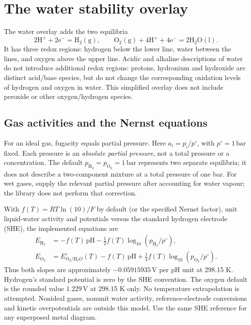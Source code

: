 \documentclass[a4paper,11pt]{ltxdoc}
\begin{document}
\section{The water stability overlay}

The water overlay adds the two equilibria
\[
 2\mathrm{H}^+ + 2\mathrm e^- = \mathrm{H}_2(\mathrm g),
 \qquad
 \mathrm{O}_2(\mathrm g)+4\mathrm{H}^++4\mathrm e^-
       = 2\mathrm{H}_2\mathrm O(\mathrm l).
\]
It has three redox regions: hydrogen below the lower line, water between the
lines, and oxygen above the upper line. Acidic and alkaline descriptions of
water do not introduce additional redox regions: protons, hydronium and
hydroxide are distinct acid/base species, but do not change the corresponding
oxidation levels of hydrogen and oxygen in water. This simplified overlay does
not include peroxide or other oxygen/hydrogen species.

\subsection{Gas activities and the Nernst equations}
For an ideal gas, fugacity equals partial pressure. Here
$a_i=p_i/p^\circ$, with $p^\circ=1\,\mathrm{bar}$ fixed. Each pressure is an
\emph{absolute partial pressure}, not a total pressure or a concentration.
The default $p_{\mathrm H_2}=p_{\mathrm O_2}=1\,\mathrm{bar}$ represents two
separate equilibria; it does not describe a two-component mixture at a total
pressure of one bar. For wet gases, supply the relevant partial pressure after
accounting for water vapour; the library does not perform that correction.

With $f(T)=RT\ln(10)/F$ by default (or the specified Nernst factor),
unit liquid-water activity and potentials versus the
standard hydrogen electrode (SHE), the implemented equations are
\begin{align*}
 E_{\mathrm H_2}&=-f(T)\,\mathrm{pH}
                  -\tfrac12 f(T)\log_{10}(p_{\mathrm H_2}/p^\circ),\\
 E_{\mathrm O_2}&=E^\circ_{\mathrm O_2/\mathrm H_2O}(T)-f(T)\,\mathrm{pH}
                  +\tfrac14 f(T)\log_{10}(p_{\mathrm O_2}/p^\circ).
\end{align*}
Thus both slopes are approximately $-0.05915935\,\mathrm{V}$ per pH unit at
298.15 K. Hydrogen's standard potential is zero by the SHE convention.
The oxygen default is the rounded value $1.229\,\mathrm V$ at 298.15 K only.
No temperature extrapolation is attempted. Nonideal gases, nonunit water
activity, reference-electrode conversions and kinetic overpotentials are
outside this model. Use the same SHE reference for any superposed metal diagram.
\end{document}
